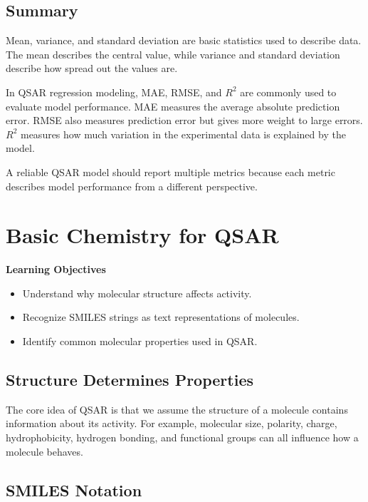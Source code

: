 \documentclass[11pt]{report}
\newenvironment{Important note}{\begin{quote}\color{red}\textbf{Important note:} }{\end{quote}}
\newenvironment{learningobjectives}
{\vspace{0.5em}\noindent\textbf{Learning Objectives}\begin{itemize}[leftmargin=*]}
{\end{itemize}\vspace{0.5em}}
\begin{document}
\section{Summary}

Mean, variance, and standard deviation are basic statistics used to describe data. The mean describes the central value, while variance and standard deviation describe how spread out the values are.

In QSAR regression modeling, MAE, RMSE, and $R^2$ are commonly used to evaluate model performance. MAE measures the average absolute prediction error. RMSE also measures prediction error but gives more weight to large errors. $R^2$ measures how much variation in the experimental data is explained by the model.

A reliable QSAR model should report multiple metrics because each metric describes model performance from a different perspective.


\chapter{Basic Chemistry for QSAR}

\begin{learningobjectives}
    \item Understand why molecular structure affects activity.
    \item Recognize SMILES strings as text representations of molecules.
    \item Identify common molecular properties used in QSAR.
\end{learningobjectives}

\section{Structure Determines Properties}

The core idea of QSAR is that we assume the structure of a molecule contains information about its activity. For example, molecular size, polarity, charge, hydrophobicity, hydrogen bonding, and functional groups can all influence how a molecule behaves.

\section{SMILES Notation}
\end{document}
